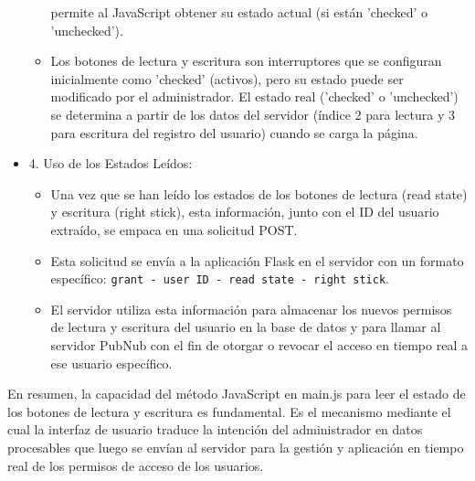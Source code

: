 \documentclass{report}
\begin{document}
\begin{itemize}
\begin{itemize}
            permite al JavaScript obtener su estado actual (si están 'checked' o 'unchecked').
            \item Los botones de lectura y escritura son interruptores que se configuran inicialmente como 'checked' (activos), pero su estado 
            puede ser modificado por el administrador. El estado real ('checked' o 'unchecked') se determina a partir de los datos del servidor 
            (índice 2 para lectura y 3 para escritura del registro del usuario) cuando se carga la página.
        \end{itemize}
    \item 4. Uso de los Estados Leídos:
        \begin{itemize}
            \item Una vez que se han leído los estados de los botones de lectura (read state) y escritura (right stick), esta información, junto 
            con el ID del usuario extraído, se empaca en una solicitud POST.
            \item Esta solicitud se envía a la aplicación Flask en el servidor con un formato específico: 
            \verb|grant - user ID - read state - right stick|.
            \item El servidor utiliza esta información para almacenar los nuevos permisos de lectura y escritura del usuario en la base de 
            datos y para llamar al servidor PubNub con el fin de otorgar o revocar el acceso en tiempo real a ese usuario específico.
        \end{itemize}
\end{itemize}
En resumen, la capacidad del método JavaScript en main.js para leer el estado de los botones de lectura y escritura es fundamental. 
Es el mecanismo mediante el cual la interfaz de usuario traduce la intención del administrador en datos procesables que luego se envían al 
servidor para la gestión y aplicación en tiempo real de los permisos de acceso de los usuarios.
\end{document}
